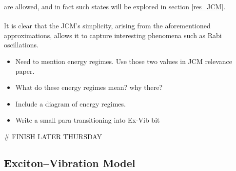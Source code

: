 \documentclass[12pt]{article}
\begin{document}
are allowed, and in fact such states will be explored in section \ref{res_JCM}.\\
\\
It is clear that the JCM's simplicity, arising from the aforementioned approximations, allows it to capture interesting phenomena such as Rabi oscillations. 

\begin{itemize}
    \item Need to mention energy regimes. Use those two values in JCM relevance paper.
    \item What do these energy regimes mean? why there?
    \item Include a diagram of energy regimes.
    \item Write a small para transitioning into Ex-Vib bit
\end{itemize}

# FINISH LATER THURSDAY


\subsection{Exciton--Vibration Model}  \label{EVM_Theory}
\end{document}
